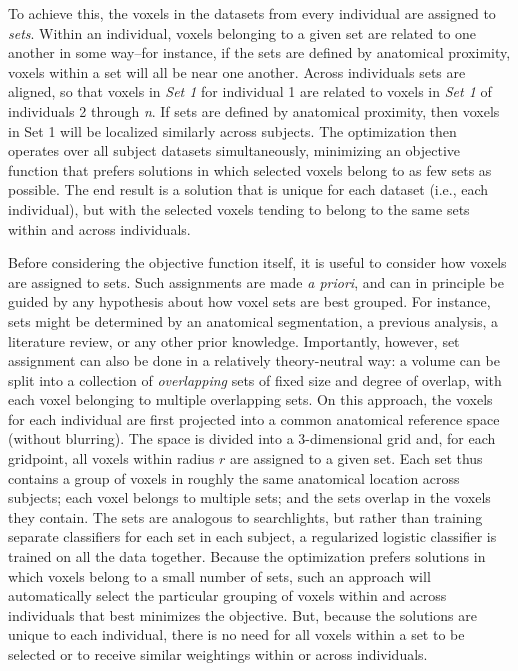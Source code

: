 To achieve this, the voxels in the datasets from every individual are assigned to {\em sets}. Within an individual, voxels belonging to a given set are related to one another in some way--for instance, if the sets are defined by anatomical proximity, voxels within a set will all be near one another. Across individuals sets are aligned, so that voxels in {\em Set 1} for individual 1 are related to voxels in {\em Set 1} of individuals 2 through {\em n}. If sets are defined by anatomical proximity, then voxels in Set 1 will be localized similarly across subjects. The optimization then operates over all subject datasets simultaneously, minimizing an objective function that prefers solutions in which selected voxels belong to as few sets as possible. The end result is a solution that is unique for each dataset (i.e., each individual), but with the selected voxels tending to belong to the same sets within and across individuals. 

Before considering the objective function itself, it is useful to consider how voxels are assigned to sets. Such assignments are made {\em a priori}, and can in principle be guided by any hypothesis about how voxel sets are best grouped. For instance, sets might be determined by an anatomical segmentation, a previous analysis, a literature review, or any other prior knowledge. Importantly, however, set assignment can also be done in a relatively theory-neutral way: a volume can be split into a collection of {\em overlapping} sets of fixed size and degree of overlap, with each voxel belonging to multiple overlapping sets. On this approach, the voxels for each individual are first projected into a common anatomical reference space (without blurring). The space is divided into a 3-dimensional grid and, for each gridpoint, all voxels within radius $r$ are assigned to a given set. Each set thus contains a group of voxels in roughly the same anatomical location across subjects; each voxel belongs to multiple sets; and the sets overlap in the voxels they contain. The sets are analogous to searchlights, but rather than training separate classifiers for each set in each subject, a regularized logistic classifier is trained on all the data together. Because the optimization prefers solutions in which voxels belong to a small number of sets, such an approach will automatically select the particular grouping of voxels within and across individuals that best minimizes the objective. But, because the solutions are unique to each individual, there is no need for all voxels within a set to be selected or to receive similar weightings within or across individuals.


